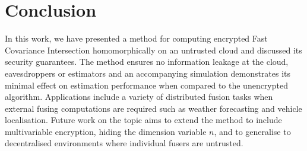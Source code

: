 \documentclass[letterpaper, 10 pt, conference]{ieeeconf}
\begin{document}
% 
%                                               
%                                               
%                                               
% 
\section{Conclusion}\label{sec:conclusion}
In this work, we have presented a method for computing encrypted Fast Covariance Intersection homomorphically on an untrusted cloud and discussed its security guarantees. The method ensures no information leakage at the cloud, eavesdroppers or estimators and an accompanying simulation demonstrates its minimal effect on estimation performance when compared to the unencrypted algorithm. Applications include a variety of distributed fusion tasks when external fusing computations are required such as weather forecasting and vehicle localisation. Future work on the topic aims to extend the method to include multivariable encryption, hiding the dimension variable $n$, and to generalise to decentralised environments where individual fusers are untrusted.




% 
%                                            
%                                            
%                                            
% 


\end{document}
